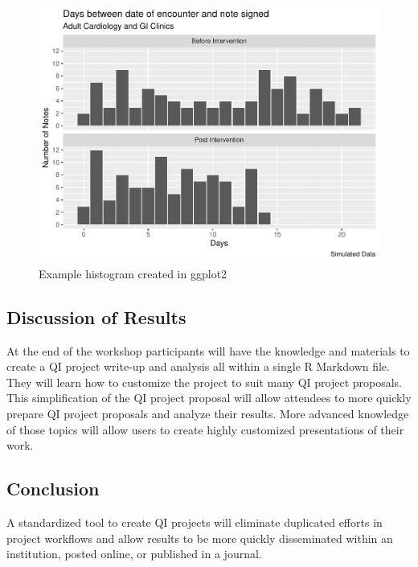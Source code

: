 \documentclass[
]{article}
\begin{document}
\begin{figure}

{\centering \includegraphics{qi_workshop_files/figure-latex/histo-1} 

}

\caption{Example histogram created in ggplot2}\label{fig:histo}
\end{figure}

\hypertarget{discussion-of-results}{%
\subsection{Discussion of Results}\label{discussion-of-results}}

At the end of the workshop participants will have the knowledge and materials to create a QI project write-up and analysis all within a single R Markdown file. They will learn how to customize the project to suit many QI project proposals. This simplification of the QI project proposal will allow attendees to more quickly prepare QI project proposals and analyze their results. More advanced knowledge of those topics will allow users to create highly customized presentations of their work.

\hypertarget{conclusion}{%
\subsection{Conclusion}\label{conclusion}}

A standardized tool to create QI projects will eliminate duplicated efforts in project workflows and allow results to be more quickly disseminated within an institution, posted online, or published in a journal.
\end{document}
